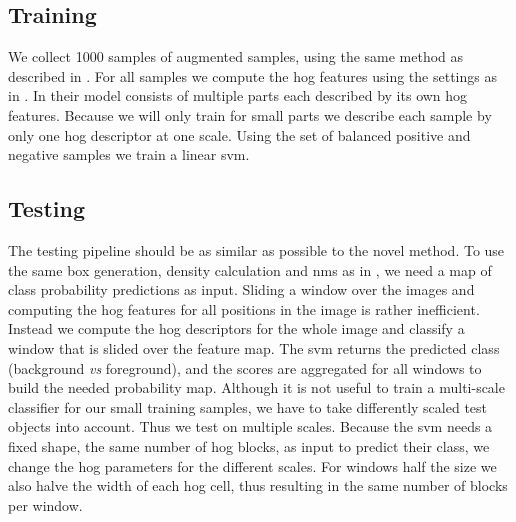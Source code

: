 \subsection{Training}
We collect 1000 samples of augmented samples, using the same method as described in . For all samples we compute the \gls{hog} features using the settings as in \citep{dalal_histograms_2005}. In \citet{felzenszwalb_object_2010} their model consists of multiple parts each described by its own \gls{hog} features. Because we will only train for small parts we describe each sample by only one \gls{hog} descriptor at one scale. Using the set of balanced positive and negative samples we train a linear \gls{svm}.
\clearpage
\subsection{Testing}
The testing pipeline should be as similar as possible to the novel method. To use the same box generation, density calculation and \gls{nms} as in , we need a map of class probability predictions as input. Sliding a window over the images and computing the \gls{hog} features for all positions in the image is rather inefficient. Instead we compute the \gls{hog} descriptors for the whole image and classify a window that is slided over the feature map. The \gls{svm} returns the predicted class (background \textit{vs} foreground), and the scores are aggregated for all windows to build the needed probability map. Although it is not useful to train a multi-scale classifier for our small training samples, we have to take differently scaled test objects into account. Thus we test on multiple scales. Because the \gls{svm} needs a fixed shape, the same number of \gls{hog} blocks, as input to predict their class, we change the \gls{hog} parameters for the different scales. For windows half the size we also halve the width of each \gls{hog} cell, thus resulting in the same number of blocks per window.

\clearpage
